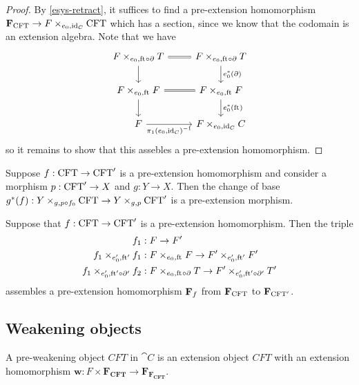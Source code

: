 \begin{proof}
By \autoref{esys-retract}, it suffices to find a pre-extension homomorphism
$\famesys{\stesys}\to\cobesys{\stesysf}{\stesys}{\ectxext}{\catid{\stesysc}}$
which has a section, since we know that the codomain is an extension
algebra. Note that we have
\begin{equation*}
\begin{tikzcd}
\cobesys{\stesysf}{\stesyst}{\ectxext}{\eft\circ\ebd}
  \ar[equals]{r}
  \ar{d}
  &
\cobesys{\stesysf}{\stesyst}{\ectxext}{\eft\circ\ebd}
  \ar{d}{\ectxext^\ast(\ebd)}
  \\
\cobesys{\stesysf}{\stesysf}{\ectxext}{\eft}
  \ar[equals]{r}
  \ar{d}
  &
\cobesys{\stesysf}{\stesysf}{\ectxext}{\eft}
  \ar{d}{\ectxext^\ast(\eft)}
  \\
\stesysf
  \ar{r}[swap]{\pullbackpr{1}{\ectxext}{\catid{\stesysc}}^{-1}}
  &
\cobesys{\stesysf}{\stesysc}{\ectxext}{\catid{\stesysc}}
\end{tikzcd}
\end{equation*}
so it remains to show that this assebles a pre-extension homomorphism.
\end{proof}

\begin{lem}
Suppose $f:\mathrm{CFT}\to \mathrm{CFT}'$ is a pre-extension homomorphism and consider a morphism
$p:\mathrm{CFT}'\to X$ and $g:Y\to X$. Then the change of base 
$g^\ast(f):\cobesys{Y}{\stesys}{g}{p\circ f_0}\to
\cobesys{Y}{\stesys'}{g}{p}$ is a pre-extension morphism.
\end{lem}

\begin{lem}
Suppose that $f:\mathrm{CFT}\to\mathrm{CFT}'$ is a pre-extension homomorphism. Then the
triple
\begin{align*}
f_1 & : \stesysf\to\stesysf'
  \\
\pullback{f_1}{f_1}{\ectxext'}{\eft'}
  & : \pullback{\stesysf}{\stesysf}{\ectxext}{\eft}
  \to \pullback{\stesysf'}{\stesysf'}{\ectxext'}{\eft'}
  \\
\pullback{f_1}{f_2}{\ectxext'}{\eft'\circ\ebd'}
  & : \pullback{\stesysf}{\stesyst}{\ectxext}{\eft\circ\ebd}
  \to \pullback{\stesysf'}{\stesyst'}{\ectxext'}{\eft'\circ\ebd'}
\end{align*}
assembles a pre-extension homomorphism $\mathbf{F}_{f}$ from
$\mathbf{F}_{\mathrm{CFT}}$ to $\mathbf{F}_{\mathrm{CFT}'}$.
\end{lem}

\subsection{Weakening objects}
\begin{defn}
A pre-weakening object $CFT$ in $\cat{C}$ is an extension object $CFT$ with 
an extension homomorphism $\mathbf{w}:F\times\mathbf{F_{CFT}}\to \mathbf{F_{F_{CFT}}}$.
\end{defn}

